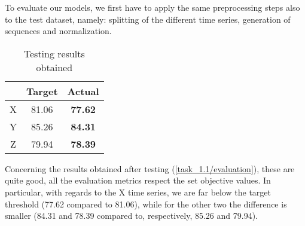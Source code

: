 \documentclass[12pt,a4paper,leqno]{article}
\begin{document}
	To evaluate our models, we first have to apply the same preprocessing steps also to the test dataset, namely: splitting of the different time series, generation of sequences and normalization.
	\begin{table}
		\centering
		\begin{tabular}{|c|c|c|}
			\hline
			  & \textbf{Target} & \textbf{Actual} \\ 
			\hline
			\hline
			X & 81.06 & \textbf{77.62} \\
			Y & 85.26 & \textbf{84.31} \\
			Z & 79.94 & \textbf{78.39} \\
			\hline
		\end{tabular}
		\caption{Testing results obtained}
		\label{task_1.1/evaluation}
	\end{table}
	Concerning the results obtained after testing (\autoref{task_1.1/evaluation}), these are quite good, all the evaluation metrics respect the set objective values. In particular, with regards to the X time series, we are far below the target threshold (77.62 compared to 81.06), while for the other two the difference is smaller (84.31 and 78.39 compared to, respectively, 85.26 and 79.94).	
	
\end{document}
